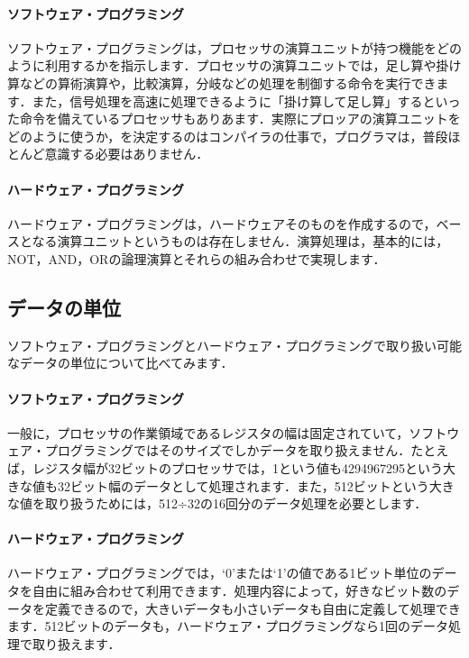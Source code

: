 \documentclass[a4paper,dvipdfmx]{jsarticle}
\begin{document}
\paragraph{ソフトウェア・プログラミング}
ソフトウェア・プログラミングは，プロセッサの演算ユニットが持つ機能をどのように利用するかを指示します．プロセッサの演算ユニットでは，足し算や掛け算などの算術演算や，比較演算，分岐などの処理を制御する命令を実行できます．また，信号処理を高速に処理できるように「掛け算して足し算」するといった命令を備えているプロセッサもありあます．実際にプロッアの演算ユニットをどのように使うか，を決定するのはコンパイラの仕事で，プログラマは，普段ほとんど意識する必要はありません．

\paragraph{ハードウェア・プログラミング}
ハードウェア・プログラミングは，ハードウェアそのものを作成するので，ベースとなる演算ユニットというものは存在しません．演算処理は，基本的には，NOT，AND，ORの論理演算とそれらの組み合わせで実現します．

\subsection{データの単位}
ソフトウェア・プログラミングとハードウェア・プログラミングで取り扱い可能なデータの単位について比べてみます．

\paragraph{ソフトウェア・プログラミング}
一般に，プロセッサの作業領域であるレジスタの幅は固定されていて，ソフトウェア・プログラミングではそのサイズでしかデータを取り扱えません．たとえば，レジスタ幅が32ビットのプロセッサでは，1という値も4294967295という大きな値も32ビット幅のデータとして処理されます．また，512ビットという大きな値を取り扱うためには，512÷32の16回分のデータ処理を必要とします．

\paragraph{ハードウェア・プログラミング}
ハードウェア・プログラミングでは，‘0’または‘1’の値である1ビット単位のデータを自由に組み合わせて利用できます．処理内容によって，好きなビット数のデータを定義できるので，大きいデータも小さいデータも自由に定義して処理できます．512ビットのデータも，ハードウェア・プログラミングなら1回のデータ処理で取り扱えます．
\end{document}
